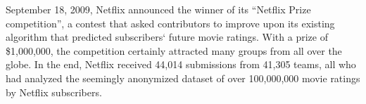 \documentclass[10pt,journal,compsoc]{IEEEtran}
\begin{document}
%
\IEEEpeerreviewmaketitle







% 
% 
% 
% 
 September 18, 2009, Netflix announced the winner of its “Netflix Prize competition”, a contest that asked contributors to improve upon its existing algorithm that predicted subscribers` future movie ratings.  With a prize of \$1,000,000, the competition certainly attracted many groups from all over the globe.  In the end, Netflix received 44,014 submissions from 41,305 teams, all who had analyzed the seemingly anonymized dataset of over 100,000,000 movie ratings by Netflix subscribers.
\end{document}
